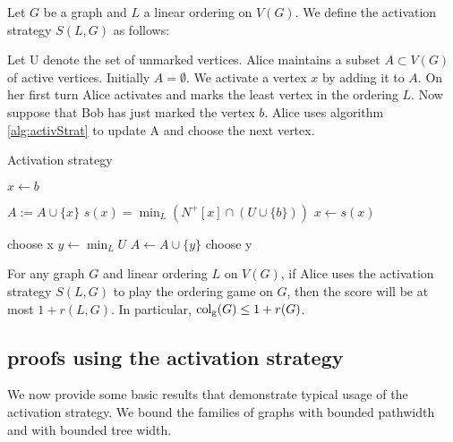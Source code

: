 \begin{definition} 
    Let $G$ be a graph and $L$ a linear ordering on $V(G)$. We define the activation strategy $S(L,G)$ as follows:
    
    Let U denote the set of unmarked vertices. Alice maintains a subset $A \subset V(G)$ of active vertices. Initially $A = \emptyset$. We activate a vertex $x$ by adding it to $A$. On her first turn Alice activates and marks the least vertex in the ordering $L$. Now suppose that Bob has just marked the vertex $b$. Alice uses algorithm \ref{alg:activStrat} to update A and choose the
    next vertex.
    \begin{algorithm}[h]
        \caption{Activation strategy}
        \label{alg:activStrat}
        \begin{algorithmic}[1]
            \Statex
            \State $x \gets b$ 
            
                \State $A := A \cup \{x\}$
                \State $s(x) =\min_L(N^+[x] \cap (U \cup \{b\} ))$
                \State $x \gets s(x)$
            \EndWhile      
            
                \State choose x
            \Else
                \State $y \gets \min_L U$
                    \State $A \gets A \cup \{y\}$                    
                \EndIf     
                \State choose y
            \EndIf   
        \end{algorithmic}
    \end{algorithm}
    
\end{definition}


\begin{theorem} \label{thm:KIERSTEAD1}
    For any graph $G$ and linear ordering $L$ on $V(G)$, if Alice uses the activation strategy $S(L, G)$ to play the ordering game on $G$, then the score will be at most $1+r(L, G)$. In particular, $\operatorname{col_g}(G) \leq 1+r(G)$.
\end{theorem}



\subsection{proofs using the activation strategy}
We now provide some basic results that demonstrate typical usage of the activation strategy. We bound the families of graphs with bounded pathwidth and with bounded tree width.

